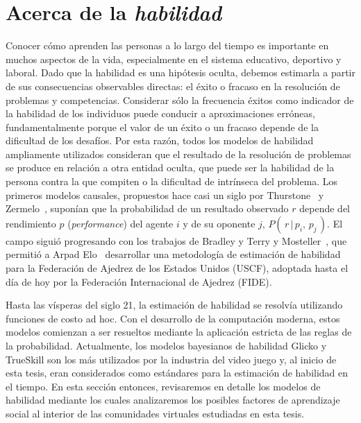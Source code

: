 \documentclass[a4paper,11pt]{book}
\theoremstyle{definition}
\begin{document}
\section{Acerca de la \emph{habilidad}} \label{sec:operacionalizacion_habilidad}

Conocer c\'omo aprenden las personas a lo largo del tiempo es importante en muchos aspectos de la vida, especialmente en el sistema educativo, deportivo y laboral.
%
Dado que la habilidad es una hip\'otesis oculta, debemos estimarla a partir de sus consecuencias observables directas: el \'exito o fracaso en la resoluci\'on de problemas y competencias.
%
Considerar s\'olo la frecuencia \'exitos como indicador de la habilidad de los individuos puede conducir a aproximaciones err\'oneas, fundamentalmente porque el valor de un \'exito o un fracaso depende de la dificultad de los desaf\'ios.
%
Por esta raz\'on, todos los modelos de habilidad ampliamente utilizados consideran que el resultado de la resoluci\'on de problemas se produce en relaci\'on a otra entidad oculta, que puede ser la habilidad de la persona contra la que compiten o la dificultad de intr\'inseca del problema.
%
Los primeros modelos causales, propuestos hace casi un siglo por Thurstone~\cite{Thurstone1927} y Zermelo~\cite{Zermelo1929}, supon\'ian que la probabilidad de un resultado observado $r$ depende del rendimiento $p$ (\emph{performance}) del agente $i$ y de su oponente $j$, $P(\, r \,|\, p_i, \, p_j \,)$.
%
El campo sigui\'o progresando con los trabajos de Bradley y Terry \cite{Bradley1952} y Mosteller~\cite{Mosteller1951a,Mosteller1951b,Mosteller1951c}, que permiti\'o a Arpad Elo~\cite{Elo2008} desarrollar una metodolog\'ia de estimaci\'on de habilidad para la Federaci\'on de Ajedrez de los Estados Unidos (USCF), adoptada hasta el d\'ia de hoy por la Federaci\'on Internacional de Ajedrez (FIDE).


Hasta las v\'isperas del siglo 21, la estimaci\'on de habilidad se resolv\'ia utilizando funciones de costo ad hoc.
%
Con el desarrollo de la computaci\'on moderna, estos modelos comienzan a ser resueltos mediante la aplicaci\'on estricta de las reglas de la probabilidad.
%
Actualmente, los modelos bayesianos de habilidad Glicko \cite{glickman2001} y TrueSkill \cite{Herbrich2007} son los m\'as utilizados por la industria del video juego y, al inicio de esta tesis, eran considerados como est\'andares para la estimaci\'on de habilidad en el tiempo.
%
En esta secci\'on entonces, revisaremos en detalle los modelos de habilidad mediante los cuales analizaremos los posibles factores de aprendizaje social al interior de las comunidades virtuales estudiadas en esta tesis.
\end{document}
